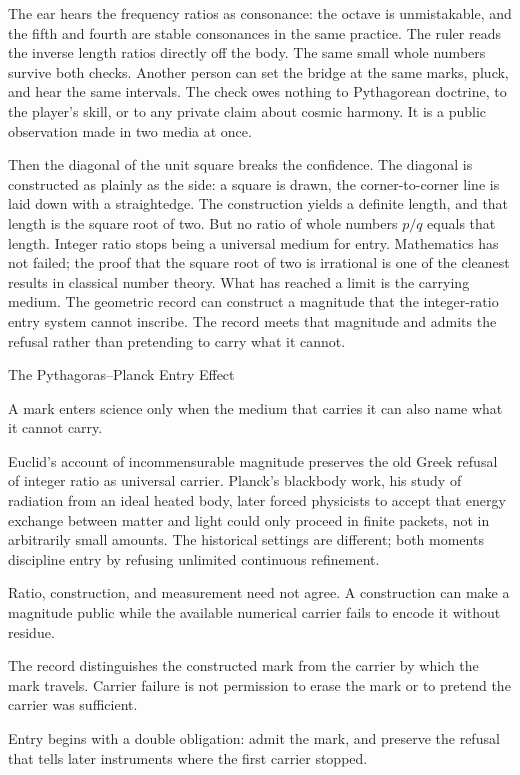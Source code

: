 The ear hears the frequency ratios as consonance: the octave is
unmistakable, and the fifth and fourth are stable consonances in the same
practice. The ruler reads the inverse length ratios directly off the body.
The same small whole numbers survive both checks. Another person can set the bridge
at the same marks, pluck, and hear the same intervals. The check owes
nothing to Pythagorean doctrine, to the player's skill, or to any private
claim about cosmic harmony. It is a public observation made in two media at once.

Then the diagonal of the unit square breaks the confidence. The diagonal
is constructed as plainly as the side: a square is drawn, the
corner-to-corner line is laid down with a straightedge. The construction
yields a definite length, and that length is the square root of two. But no
ratio of whole numbers $p/q$ equals that length. Integer ratio stops being a
universal medium for entry. Mathematics has not failed; the proof that the
square root of two is irrational is one of the cleanest results in
classical number theory. What has reached a limit is the carrying medium.
The geometric record can construct a magnitude that the integer-ratio entry
system cannot inscribe. The record meets that magnitude and admits the
refusal rather than pretending to carry what it cannot.

\begin{phenom}{The Pythagoras--Planck Entry Effect~\cite{euclid300bc,planck1900}}
\label{ph:pythagoras-planck-entry}

\PhStatement
A mark enters science only when the medium that carries it can also name what
it cannot carry.

\PhOrigin
Euclid's account of incommensurable magnitude preserves the old Greek refusal
of integer ratio as universal carrier. Planck's blackbody work, his
study of radiation from an ideal heated body, later forced physicists to
accept that energy exchange between matter and light could only proceed in
finite packets, not in arbitrarily small amounts. The historical
settings are different; both moments discipline entry by refusing unlimited
continuous refinement.

\PhObservation
Ratio, construction, and measurement need not agree. A construction can make a
magnitude public while the available numerical carrier fails to encode it
without residue.

\PhConstraint
The record distinguishes the constructed mark from the carrier by which the
mark travels. Carrier failure is not permission to erase the mark or to
pretend the carrier was sufficient.

\PhConsequence
Entry begins with a double obligation: admit the mark, and preserve the refusal
that tells later instruments where the first carrier stopped.
\end{phenom}

